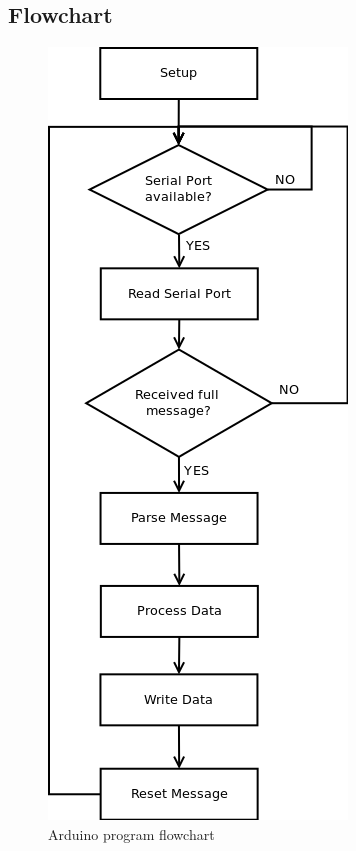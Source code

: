 \subsection{Flowchart}
	\begin{figure}[H]
			\centering
			\includegraphics[scale=0.75]{images/Diagrams/arduino.png}
			\caption{Arduino program flowchart }
			\label{}
	\end{figure}
	\bigskip